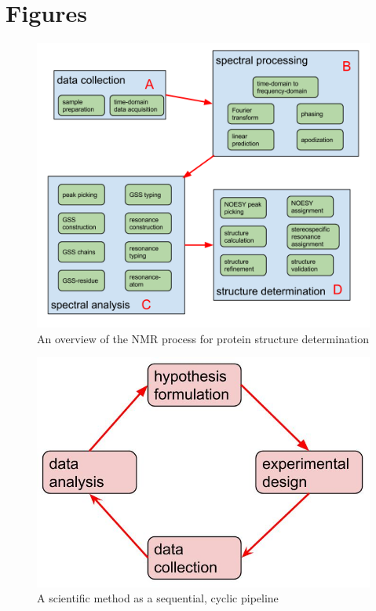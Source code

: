\clearpage
\section{Figures}

\begin{figure}[h]
  \includegraphics[scale=0.42]{figures/nmr_overview}
  \caption{An overview of the NMR process for protein structure determination}
  \label{nmr_overview}
\end{figure}

\begin{figure}
  \includegraphics[scale=0.5]{figures/scientific_method_pipeline}
  \caption{A scientific method as a sequential, cyclic pipeline}
  \label{scientific_method_pipeline}
\end{figure}


